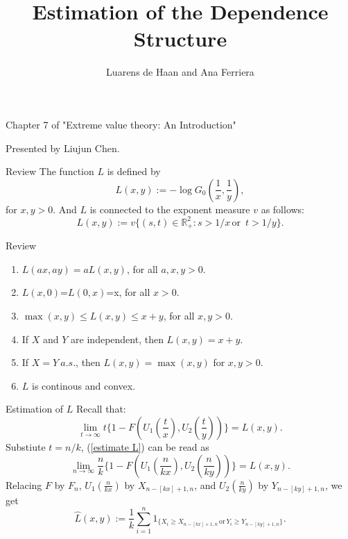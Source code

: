 \documentclass[11pt]{beamer}
\author{Luarens de Haan and Ana Ferriera}
\title{Estimation of the Dependence Structure}
\begin{document}
\begin{frame}
\titlepage
\begin{center}
	Chapter 7 of "Extreme value theory: An Introduction"

	\bigskip
	Presented by Liujun Chen.
\end{center}
\end{frame}


\begin{frame}{Review}
The function $L$ is defined by
$$L(x,y):=-\log G_0(\frac{1}{x},\frac{1}{y}),$$
for $x,y>0$. And $L$ is connected to the exponent measure $v$ as follows:
\begin{displaymath}
L(x,y):=v\{ (s,t)\in \mathbb{R}_{+}^2: s>1/x \, \text{or }\, t>1/y\}.
\end{displaymath}
\end{frame}

\begin{frame}{Review}
\begin{enumerate}
\item $L(ax,ay)=aL(x,y)$, for all $a,x,y>0$.
\item $L(x,0)$=$L(0,x)$=x, for all $x>0$.
\item $\max(x,y)\le L(x,y)\le x+y $, for all $x,y>0$.
\item If $X$ and $Y$ are independent, then $L(x,y)=x+y.$
\item If $X=Y \ a.s.$, then $L(x,y)=\max(x,y)$ for $x,y >0$.
\item $L$ is continous and convex.
\end{enumerate}
\end{frame}






\begin{frame}{Estimation of $L$}
Recall that:
\begin{equation}\label{estimate L}
\lim_{t \to \infty}t \{ 1-F(U_1(\frac{t}{x}),U_2(\frac{t}{y}))\}=L(x,y).
\end{equation}
Substiute $t=n/k$,
(\ref{estimate L}) can be read as
\begin{equation}
\lim_{n \to \infty}\frac{n}{k}\{ 1-F(U_1(\frac{n}{kx}),U_2(\frac{n}{ky}))\}=L(x,y).
\end{equation}
Relacing $F$ by $F_n$, $U_1(\frac{n}{kx})$ by $X_{n-[kx]+1,n}$, and  $U_2(\frac{n}{ky})$ by $Y_{n-[ky]+1,n}$, we get
\begin{equation}
\hat{L}(x,y):=\frac{1}{k}\sum_{i=1}^n 1_{\{X_i\ge X_{n-[kx]+1,n}\, \text{or}\, Y_i \ge Y_{n-[ky]+1,n}\}}.
\end{equation}
\end{frame}
\end{document}
